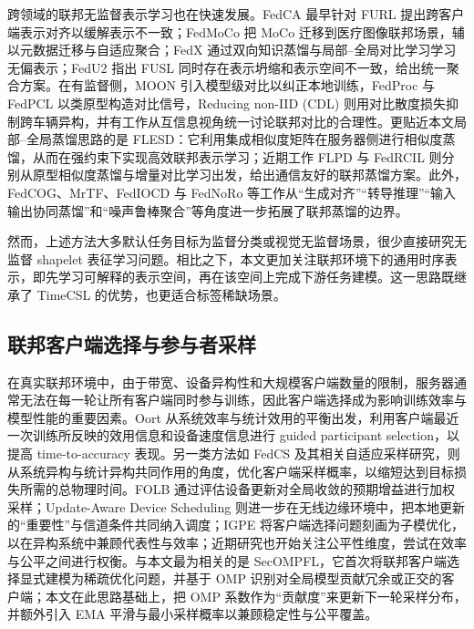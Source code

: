 \documentclass{article}
\begin{document}
跨领域的联邦无监督表示学习也在快速发展。FedCA 最早针对 FURL 提出跨客户端表示对齐以缓解表示不一致\cite{fedca}；FedMoCo 把 MoCo 迁移到医疗图像联邦场景，辅以元数据迁移与自适应聚合\cite{fedmoco}；FedX 通过双向知识蒸馏与局部--全局对比学习学习无偏表示\cite{fedx}；FedU2 指出 FUSL 同时存在表示坍缩和表示空间不一致，给出统一聚合方案\cite{fedu2}。在有监督侧，MOON 引入模型级对比以纠正本地训练\cite{moon}，FedProc 与 FedPCL 以类原型构造对比信号\cite{fedproc,fedpcl}，Reducing non-IID (CDL) 则用对比散度损失抑制跨车辆异构\cite{fedcdl}，并有工作从互信息视角统一讨论联邦对比的合理性\cite{fedmi}。更贴近本文局部--全局蒸馏思路的是 FLESD\cite{flesd}：它利用集成相似度矩阵在服务器侧进行相似度蒸馏，从而在强约束下实现高效联邦表示学习；近期工作 FLPD\cite{flpd} 与 FedRCIL\cite{fedrcil} 则分别从原型相似度蒸馏与增量对比学习出发，给出通信友好的联邦蒸馏方案。此外，FedCOG\cite{fedcog}、MrTF\cite{mrtf}、FedIOCD\cite{fediocd} 与 FedNoRo\cite{fednoro} 等工作从“生成对齐”“转导推理”“输入输出协同蒸馏”和“噪声鲁棒聚合”等角度进一步拓展了联邦蒸馏的边界。

然而，上述方法大多默认任务目标为监督分类或视觉无监督场景，很少直接研究无监督 shapelet 表征学习问题。相比之下，本文更加关注联邦环境下的通用时序表示，即先学习可解释的表示空间，再在该空间上完成下游任务建模。这一思路既继承了 TimeCSL 的优势\cite{timescsl}，也更适合标签稀缺场景\cite{fedsmall}。

\subsection{联邦客户端选择与参与者采样}

在真实联邦环境中，由于带宽、设备异构性和大规模客户端数量的限制，服务器通常无法在每一轮让所有客户端同时参与训练，因此客户端选择成为影响训练效率与模型性能的重要因素。Oort 从系统效率与统计效用的平衡出发，利用客户端最近一次训练所反映的效用信息和设备速度信息进行 guided participant selection，以提高 time-to-accuracy 表现\cite{oort}。另一类方法如 FedCS 及其相关自适应采样研究，则从系统异构与统计异构共同作用的角度，优化客户端采样概率，以缩短达到目标损失所需的总物理时间\cite{fedcsadaptive}。FOLB 通过评估设备更新对全局收敛的预期增益进行加权采样\cite{folb}；Update-Aware Device Scheduling 则进一步在无线边缘环境中，把本地更新的“重要性”与信道条件共同纳入调度\cite{updateaware}；IGPE 将客户端选择问题刻画为子模优化，以在异构系统中兼顾代表性与效率\cite{igpe}；近期研究也开始关注公平性维度，尝试在效率与公平之间进行权衡\cite{fairerfl}。与本文最为相关的是 SecOMPFL\cite{secompfl}，它首次将联邦客户端选择显式建模为稀疏优化问题，并基于 OMP 识别对全局模型贡献冗余或正交的客户端；本文在此思路基础上，把 OMP 系数作为“贡献度”来更新下一轮采样分布，并额外引入 EMA 平滑与最小采样概率以兼顾稳定性与公平覆盖。
\end{document}
